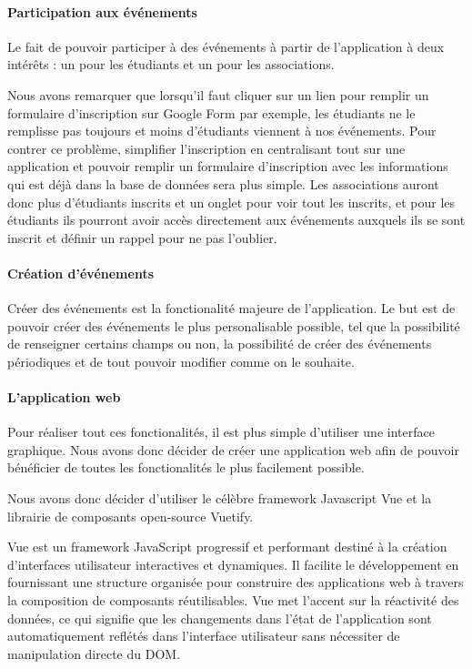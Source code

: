 \paragraph{Participation aux événements}

Le fait de pouvoir participer à des événements à partir de l'application à deux intérêts : un pour les étudiants et un pour les associations.

Nous avons remarquer que lorsqu'il faut cliquer sur un lien pour remplir un formulaire d'inscription sur Google Form par exemple, les étudiants ne le remplisse pas toujours et moins d'étudiants viennent à nos événements. Pour contrer ce problème, simplifier l'inscription en centralisant tout sur une application et pouvoir remplir un formulaire d'inscription avec les informations qui est déjà dans la base de données sera plus simple. Les associations auront donc plus d'étudiants inscrits et un onglet pour voir tout les inscrits, et pour les étudiants ils pourront avoir accès directement aux événements auxquels ils se sont inscrit et définir un rappel pour ne pas l'oublier.

\paragraph{Création d'événements}

Créer des événements est la fonctionalité majeure de l'application. Le but est de pouvoir créer des événements le plus personalisable possible, tel que la possibilité de renseigner certains champs ou non, la possibilité de créer des événements périodiques et de tout pouvoir modifier comme on le souhaite.

\paragraph{L'application web}

Pour réaliser tout ces fonctionalités, il est plus simple d'utiliser une interface graphique. Nous avons donc décider de créer une application web afin de pouvoir bénéficier de toutes les fonctionalités le plus facilement possible.

Nous avons donc décider d'utiliser le célèbre framework Javascript Vue et la librairie de composants open-source Vuetify.

Vue est un framework JavaScript progressif et performant destiné à la création d'interfaces utilisateur interactives et dynamiques. Il facilite le développement en fournissant une structure organisée pour construire des applications web à travers la composition de composants réutilisables. Vue met l'accent sur la réactivité des données, ce qui signifie que les changements dans l'état de l'application sont automatiquement reflétés dans l'interface utilisateur sans nécessiter de manipulation directe du DOM.

